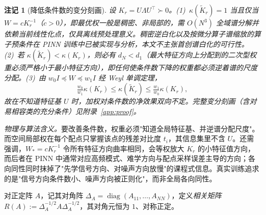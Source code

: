 \documentclass[fontset=windows,11pt]{ctexart}
\newcommand{\W}{W}
\DeclareMathOperator{\diag}{diag}
\newtheorem*{remark}{注记}
\numberwithin{equation}{section}
\begin{document}
\begin{remark}[降低条件数的变分刻画]\label{rem:variational}
设 $K_r=U\Lambda U^\top\succ0$。(1)~$\kappa(\widetilde K_r)=1$ 当且仅当 $\W=cK_r^{-1}$（$c>0$），即最优权一般是稠密、\emph{非局部}的，需 $O(N^3)$ 全域谱分解并依赖当前线性化点，仅具离线预处理意义。稠密逆白化以及按微分算子谱缩放的算子预条件在 PINN 训练中\emph{已被实现与分析}\cite{deRyckOp2024,PCPINN2024}，本文不主张首创谱白化的可行性。(2)~若 $\kappa(\widetilde K_r)<\kappa(K_r)$，则必有 $d_N<d_1$（最大特征方向上分配到的二次型权重必须严格小于最小特征方向），即任何使条件数下降的权重都必须逆着谱的尺度分配。(3)~由 $w_0I\preceq\W\preceq w_1I$ 经 Weyl 单调定理，
\begin{equation}\label{eq:kappabound}
\tfrac{w_0}{w_1}\kappa(K_r)\le\kappa(\widetilde K_r)\le\tfrac{w_1}{w_0}\kappa(K_r),
\end{equation}
故在不知道特征基 $U$ 时，加权对条件数的净效果双向不定。完整变分刻画（含对易相容类的充分条件）见附录~\ref{app:proof}。
\end{remark}

\noindent\emph{物理与算法含义。}要改善条件数，权重必须"知道全局特征基、并逆谱分配尺度"。而空间局部权在每个配点只掌握该点的残差对比度 $t_i$，其信息集里不含 $U$。还需强调，$\W_*=cK_r^{-1}$ 令所有特征方向曲率相同，会等权放大 $K_r$ 的小特征值方向，而后者在 PINN 中通常对应高频模式、难学方向与配点采样误差主导的方向；各向同性同时抹掉了"先学信号方向、对噪声方向放慢"的课程式信息。真实训练追求的是"信号方向条件数小、噪声方向被正则化"，而非全局各向同性。

对正定阵 $A$，记其对角阵 $\Delta_A=\diag(A_{11},\dots,A_{NN})$，定义\emph{相关矩阵} $R(A):=\Delta_A^{-1/2}A\Delta_A^{-1/2}$，其对角元恒为 $1$、对称正定。
\end{document}
